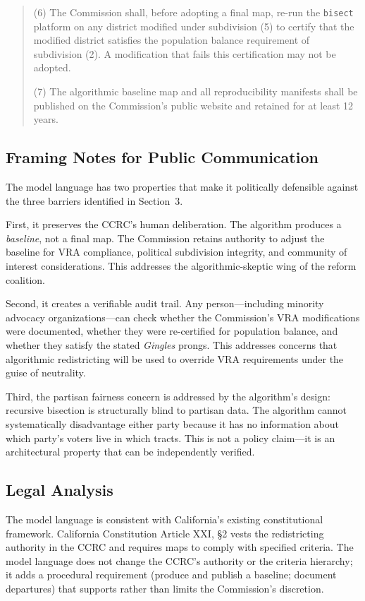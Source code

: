 \begin{quote}
(6) The Commission shall, before adopting a final map, re-run the \texttt{bisect} platform on any district modified under subdivision (5) to certify that the modified district satisfies the population balance requirement of subdivision (2). A modification that fails this certification may not be adopted.

(7) The algorithmic baseline map and all reproducibility manifests shall be published on the Commission's public website and retained for at least 12 years.
\end{quote}

\subsection{Framing Notes for Public Communication}

The model language has two properties that make it politically defensible against the three barriers identified in Section~3.

First, it preserves the CCRC's human deliberation. The algorithm produces a \emph{baseline}, not a final map. The Commission retains authority to adjust the baseline for VRA compliance, political subdivision integrity, and community of interest considerations. This addresses the algorithmic-skeptic wing of the reform coalition.

Second, it creates a verifiable audit trail. Any person---including minority advocacy organizations---can check whether the Commission's VRA modifications were documented, whether they were re-certified for population balance, and whether they satisfy the stated \textit{Gingles} prongs. This addresses concerns that algorithmic redistricting will be used to override VRA requirements under the guise of neutrality.

Third, the partisan fairness concern is addressed by the algorithm's design: recursive bisection is structurally blind to partisan data. The algorithm cannot systematically disadvantage either party because it has no information about which party's voters live in which tracts. This is not a policy claim---it is an architectural property that can be independently verified.

\subsection{Legal Analysis}

The model language is consistent with California's existing constitutional framework. California Constitution Article XXI, \S2 vests the redistricting authority in the CCRC and requires maps to comply with specified criteria. The model language does not change the CCRC's authority or the criteria hierarchy; it adds a procedural requirement (produce and publish a baseline; document departures) that supports rather than limits the Commission's discretion.

